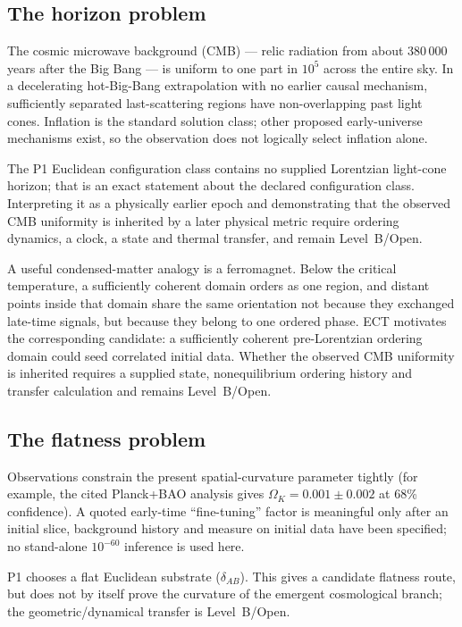 \documentclass[11pt,a4paper]{article}
\begin{document}
\subsection{The horizon problem}

The cosmic microwave background (CMB) --- relic radiation from about
380\,000 years after the Big Bang --- is uniform to one part in $10^5$ across
the entire sky.  In a decelerating hot-Big-Bang extrapolation with no earlier
causal mechanism, sufficiently separated last-scattering regions have
non-overlapping past light cones.  Inflation is the standard solution class;
other proposed early-universe mechanisms exist, so the observation does not
logically select inflation alone.

The P1 Euclidean configuration class contains no supplied Lorentzian
light-cone horizon; that is an exact statement about the declared
configuration class.  Interpreting it as a physically earlier epoch and
demonstrating that the observed CMB uniformity is inherited by a later
physical metric require ordering dynamics, a clock, a state and thermal
transfer, and remain Level~B/Open.

A useful condensed-matter analogy is a ferromagnet. Below the critical temperature, a sufficiently coherent domain orders as one region, and distant points inside that domain share the same orientation not because they exchanged late-time signals, but because they belong to one ordered phase.  ECT motivates the corresponding candidate: a sufficiently coherent pre-Lorentzian ordering domain could seed correlated initial data. Whether the observed CMB uniformity is inherited requires a supplied state, nonequilibrium ordering history and transfer calculation and remains Level~B/Open.

\subsection{The flatness problem}

Observations constrain the present spatial-curvature parameter tightly
(for example, the cited Planck+BAO analysis gives
$\Omega_K=0.001\pm0.002$ at 68\% confidence).  A quoted
early-time ``fine-tuning'' factor is meaningful only after an initial slice,
background history and measure on initial data have been specified; no
stand-alone $10^{-60}$ inference is used here.

P1 chooses a flat Euclidean substrate ($\delta_{AB}$).  This gives a candidate flatness route, but does not by itself prove the curvature of the emergent cosmological branch; the geometric/dynamical transfer is Level~B/Open.
\end{document}
